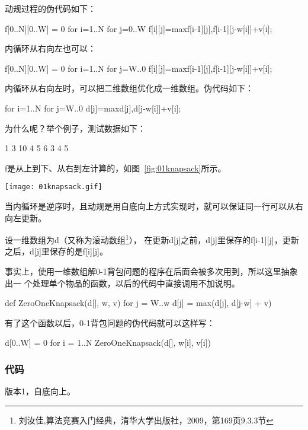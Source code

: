 动规过程的伪代码如下：
\begin{Code}
f[0..N][0..W] = 0
for i=1..N
    for j=0..W
        f[i][j]=max{f[i-1][j],f[i-1][j-w[i]]+v[i]};
\end{Code}

内循环从右向左也可以：
\begin{Code}
f[0..N][0..W] = 0
for i=1..N
    for j=W..0
        f[i][j]=max{f[i-1][j],f[i-1][j-w[i]]+v[i]};
\end{Code}

内循环从右向左时，可以把二维数组优化成一维数组。伪代码如下：
\begin{Code}
for i=1..N
    for j=W..0
        d[j]=max{d[j],d[j-w[i]]+v[i]};
\end{Code}

为什么呢？举个例子，测试数据如下：
\begin{Code}
1
3 10
4 5 6
3 4 5
\end{Code}

f是从上到下、从右到左计算的，如图~\ref{fig:01knapsack}所示。
\begin{center}
\texttt{[image: 01knapsack.gif]}\\
\label{fig:01knapsack}
\end{center}

当内循环是逆序时，且动规是用自底向上方式实现时，就可以保证同一行可以从右向左更新。

设一维数组为d（又称为滚动数组\footnote{刘汝佳,算法竞赛入门经典，清华大学出版社，2009，第169页9.3.3节}），
在更新d[j]之前，d[j]里保存的f[i-1][j]，更新之后，d[j]里保存的是f[i][j]。

事实上，使用一维数组解0-1背包问题的程序在后面会被多次用到，所以这里抽象出一
个处理单个物品的函数，以后的代码中直接调用不加说明。
\begin{Code}
def ZeroOneKnapsack(d[], w, v)
    for j = W..w
        d[j] = max(d[j], d[j-w] + v)
\end{Code}

有了这个函数以后，0-1背包问题的伪代码就可以这样写：
\begin{Code}
d[0..W] = 0
for i = 1..N
    ZeroOneKnapsack(d[], w[i], v[i])
\end{Code}

\subsubsection{代码}
版本1，自底向上。

